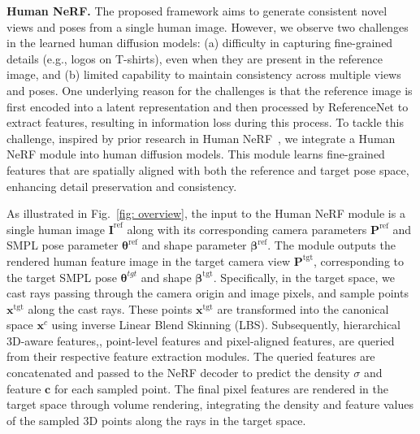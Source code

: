 \noindent \textbf{Human NeRF.}
The proposed framework aims to generate consistent novel views and poses from a single human image. 
However, we observe two challenges in the learned human diffusion models: (a) difficulty in capturing fine-grained details (e.g., logos on T-shirts), even when they are present in the reference image, and (b) limited capability to maintain consistency across multiple views and poses.
One underlying reason for the challenges is that the reference image is first encoded into a latent representation and then processed by ReferenceNet to extract features, resulting in information loss during this process.
To tackle this challenge, inspired by prior research in Human NeRF~\cite{peng2021neural, hu2023sherf, chen2021animatable, animatablenerf, xu2021h, noguchi2021neural, weng2022humannerf, su2021nerf, jiang2022selfrecon, jiang2022neuman, wang2022arah, kwon2021neural, gao2022mps, choi2022mononhr, zhao2021humannerf, huang2022elicit}, we integrate a Human NeRF module into human diffusion models.
This module learns fine-grained features that are spatially aligned with both the reference and target pose space, enhancing detail preservation and consistency.

As illustrated in Fig.~\ref{fig: overview}, the input to the Human NeRF module is a single human image $\mathbf{I}^\text{ref}$ along with its corresponding camera parameters $\bm{P}^\text{ref}$ and SMPL pose parameter $\bm{\theta}^\text{ref}$ and shape parameter $\bm{\beta}^\text{ref}$.
The module outputs the rendered human feature image in the target camera view $\bm{P}^\text{tgt}$, corresponding to the target SMPL pose $\bm{\theta}^{tgt}$ and shape $\bm{\beta}^\text{tgt}$.
Specifically, in the target space, we cast rays passing through the camera origin and image pixels, and sample points $\bm{x}^\text{tgt}$ along the cast rays. 
These points $\bm{x}^\text{tgt}$ are transformed into the canonical space $\bm{x}^{c}$ using inverse Linear Blend Skinning (LBS).
Subsequently, hierarchical 3D-aware features,\ie, point-level features and pixel-aligned features, are queried from their respective feature extraction modules.
The queried features are concatenated and passed to the NeRF decoder to predict the density $\sigma$ and feature $\bm{c}$ for each sampled point. 
The final pixel features are rendered in the target space through volume rendering, integrating the density and feature values of the sampled 3D points along the rays in the target space.

